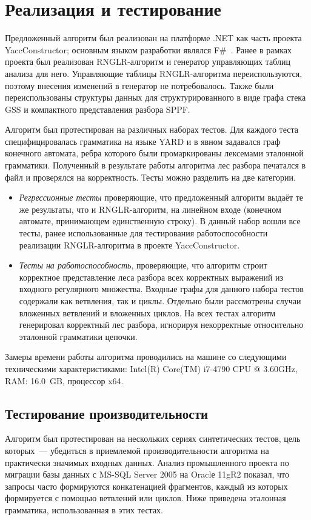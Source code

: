 \section{Реализация и тестирование}
Предложенный алгоритм был реализован на платформе .NET как часть проекта YaccConstructor; основным языком разработки являлся F\#~\cite{FSharp}. Ранее в рамках проекта был реализован RNGLR-алгоритм и генератор управляющих таблиц анализа для него. Управляющие таблицы RNGLR-алгоритма переиспользуются, поэтому внесения изменений в генератор не потребовалось. Также были переиспользованы структуры данных для структурированного в виде графа стека GSS и компактного представления разбора SPPF. 

Алгоритм был протестирован на различных наборах тестов. Для каждого теста специфицировалась грамматика на языке YARD и в явном задавался граф конечного автомата, ребра которого были промаркированы лексемами эталонной грамматики. Полученный в результате работы алгоритма лес разбора печатался в файл и проверялся на корректность. Тесты можно разделить на две категории.
\begin{itemize}
  \item \emph{Регрессионные тесты} проверяющие, что предложенный алгоритм выдаёт те же результаты, что и RNGLR-алгоритм, на линейном входе (конечном автомате, принимающем единственную строку). В данный набор вошли все тесты, ранее использованные для тестирования работоспособности реализации RNGLR-алгоритма в проекте YaccConstructor. 
  \item \emph{Тесты на работоспособность}, проверяющие, что алгоритм строит корректное представление леса разбора всех корректных выражений из входного регулярного множества. Входные графы для данного набора тестов содержали как ветвления, так и циклы. Отдельно были рассмотрены случаи вложенных ветвлений и вложенных циклов. На всех тестах алгоритм генерировал корректный лес разбора, игнорируя некорректные относительно эталонной грамматики цепочки.
\end{itemize}

Замеры времени работы алгоритма проводились на машине со следующими техническими характеристиками: Intel(R) Core(TM) i7-4790 CPU @ 3.60GHz, RAM: 16.0~GB, процессор x64.

\subsection{Тестирование производительности}
Алгоритм был протестирован на нескольких сериях синтетических тестов, цель которых~--- убедиться в приемлемой производительности алгоритма на практически значимых входных данных. Анализ промышленного проекта по миграции базы данных с MS-SQL Server 2005 на Oraclе 11gR2 показал, что запросы часто формируются конкатенацией фрагментов, каждый из которых формируется с помощью ветвлений или циклов. Ниже приведена эталонная грамматика, использованная в этих тестах. 


